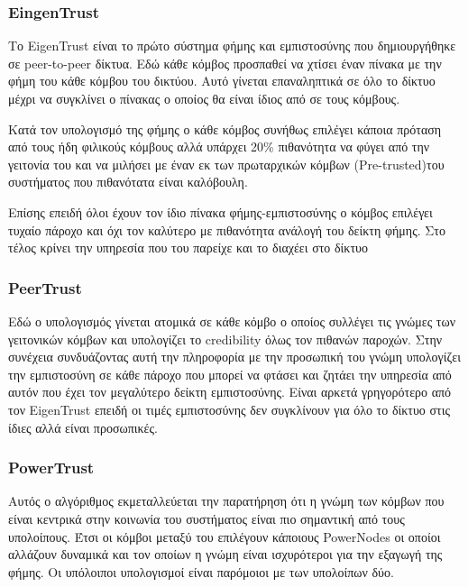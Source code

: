 \subsubsection{EingenTrust}

Το EigenTrust \cite{EigenTrust}
 είναι το πρώτο σύστημα φήμης και εμπιστοσύνης που δημιουργήθηκε σε peer-to-peer δίκτυα. Εδώ κάθε κόμβος προσπαθεί να χτίσει έναν πίνακα με την φήμη του κάθε κόμβου του δικτύου. Αυτό γίνεται επαναληπτικά σε όλο το δίκτυο μέχρι να συγκλίνει ο πίνακας ο οποίος θα είναι ίδιος από σε τους κόμβους. 
 
Κατά τον υπολογισμό της φήμης ο κάθε κόμβος συνήθως επιλέγει κάποια πρόταση από τους ήδη φιλικούς κόμβους αλλά υπάρχει 20\% πιθανότητα να φύγει από την γειτονία του και να μιλήσει με έναν εκ των πρωταρχικών κόμβων (Pre-trusted)του συστήματος που πιθανότατα είναι καλόβουλη.

Επίσης επειδή όλοι έχουν τον ίδιο πίνακα φήμης-εμπιστοσύνης ο κόμβος επιλέγει τυχαίο πάροχο και όχι τον καλύτερο με πιθανότητα ανάλογή του δείκτη φήμης. Στο τέλος κρίνει την υπηρεσία που του παρείχε και το διαχέει στο δίκτυο

\subsubsection{PeerTrust}

Εδώ \cite{PeerTrust} ο υπολογισμός γίνεται ατομικά σε κάθε κόμβο ο οποίος συλλέγει τις γνώμες των γειτονικών κόμβων και υπολογίζει το credibility όλως τον πιθανών παροχών. Στην συνέχεια συνδυάζοντας αυτή την πληροφορία με την προσωπική του γνώμη υπολογίζει την εμπιστοσύνη σε κάθε πάροχο που μπορεί να φτάσει και ζητάει την υπηρεσία από αυτόν που έχει τον μεγαλύτερο δείκτη εμπιστοσύνης. Είναι αρκετά γρηγορότερο από τον EigenTrust επειδή οι τιμές εμπιστοσύνης δεν συγκλίνουν για όλο το δίκτυο στις ίδιες αλλά είναι προσωπικές.


\subsubsection{PowerTrust}

Αυτός ο αλγόριθμος \cite{PowerTrust} εκμεταλλεύεται την παρατήρηση ότι η γνώμη των κόμβων που είναι κεντρικά στην κοινωνία του συστήματος είναι πιο σημαντική από τους υπολοίπους. Έτσι οι κόμβοι μεταξύ του επιλέγουν κάποιους PowerNodes οι οποίοι αλλάζουν δυναμικά και τον οποίων η γνώμη είναι ισχυρότεροι για την εξαγωγή της φήμης. Οι υπόλοιποι υπολογισμοί είναι παρόμοιοι με των υπολοίπων δύο.



